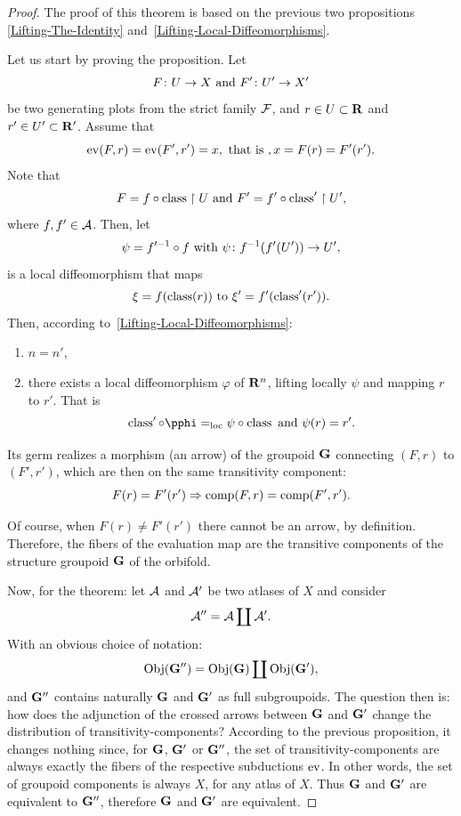 \begin{proof}
  The proof of this theorem is based on the previous two propositions \textsection\,\ref{Lifting-The-Identity} and  \textsection\,\ref{Lifting-Local-Diffeomorphisms}.

  Let us start by proving the proposition.
  Let
  $$
    F \colon U \to X \ \text{and}\  F' \colon U' \to X'
  $$
  be two generating plots from the strict family $\mathcal{F}$,
  and $r \in U \subset \mathbf{R}$ and $r' \in U' \subset \mathbf{R}'$.
  Assume that
  $$
    {\operatorname{ev}}(F,r) = {\operatorname{ev}}(F',r') = x,
    \ \text{that is}\ ,
    x = F(r) = F'(r').
  $$
  Note that
  $$
    F = f \circ \operatorname{class} \restriction U
    \ \text{and}\ 
    F' = f' \circ \operatorname{class}' \restriction U',
  $$
  where $f, f' \in \mathcal{A}$.
  Then,
  let
  $$
    \psi = f'^{-1} \circ f
    \ \text{with}\ 
    \psi \colon f^{-1}(f'(U')) \to U',
  $$
  is a local diffeomorphism that maps
  $$
    \xi = f(\operatorname{class}(r))
    \ \text{to}\ 
    \xi' = f'(\operatorname{class}'(r')).
  $$
  Then,
  according to \textsection\,\ref{Lifting-Local-Diffeomorphisms}:

  \begin{enumerate}
    \item $n=n'$,
    \item there exists a local diffeomorphism $\varphi$ of $\mathbf{R}^n$,
    lifting locally $\psi$ and  mapping $r$ to $r'$.
    That is
    $$
      \Class' \circ \pphi =_\loc \psi \circ \Class
      \SpacedText{and} \psi(r) = r'.
    $$
  \end{enumerate}
  Its germ realizes a morphism (an arrow) of the groupoid ${\mathbf G}$ connecting $(F,r)$ to $(F',r')$,
  which are then on the same transitivity component:
  $$
    F(r) = F'(r') \Rightarrow \operatorname{comp}(F,r) = \operatorname{comp}(F',r').
  $$

  Of course,
  when $F(r) \neq F'(r')$ there cannot be an arrow, by definition.
  Therefore,
  the fibers of the evaluation map are the transitive components of the structure groupoid ${\mathbf G}$ of the orbifold.

  Now,
  for the theorem:
  let $\mathcal{A}$ and $\mathcal{A}'$ be two atlases of $X$ and consider
  $$
    \mathcal{A}'' = \mathcal{A} \coprod \mathcal{A}'.
  $$
  With an obvious choice of notation:
  $$
    {\operatorname{Obj}}({\mathbf G}'')={\operatorname{Obj}}({\mathbf G}) \coprod {\operatorname{Obj}}({\mathbf G}'),
  $$
  and ${\mathbf G}''$ contains naturally ${\mathbf G}$ and ${\mathbf G}'$ as full subgroupoids.
  The question then is:
  how does the adjunction of the crossed arrows between ${\mathbf G}$ and ${\mathbf G}'$ change the distribution of transitivity-components?
  According to the previous proposition,
  it changes nothing since,
  for ${\mathbf G}$,
  ${\mathbf G}'$ or ${\mathbf G}''$,
  the set of transitivity-components are always exactly the fibers of the respective subductions ${\operatorname{ev}}$.
  In other words,
  the set of groupoid components is always $X$,
  for any atlas of $X$.
  Thus ${\mathbf G}$ and ${\mathbf G}'$ are equivalent to ${\mathbf G}''$,
  therefore ${\mathbf G}$ and ${\mathbf G}'$ are equivalent.
\end{proof}

